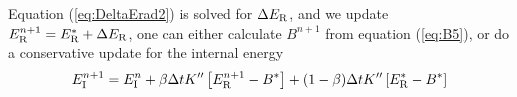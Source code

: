 \documentclass[12pt]{article}
\newcommand{\Eint}{E_{\rm I}}
\newcommand{\Erad}{E_{\rm R}}
\begin{document}
Equation (\ref{eq:DeltaErad2}) is solved for $\Delta \Erad$,
and we update $\Erad^{n+1} = \Erad^* + \Delta \Erad$, one can 
either calculate $B^{n+1}$ from equation (\ref{eq:B5}), 
or do a conservative update for the internal energy
\begin{equation}
  \Eint^{n+1} = \Eint^n + \beta \Delta t K''\left[\Erad^{n+1} - B^*\right]
                        + (1-\beta) \Delta t K''\left[\Erad^* - B^*\right]
\end{equation}
\end{document}
